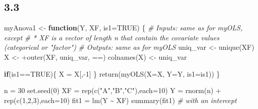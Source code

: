 \documentclass[
  11pt,
]{article}
\newenvironment{Shaded}{\begin{snugshade}}{\end{snugshade}}
\newcommand{\AttributeTok}[1]{\textcolor[rgb]{0.77,0.63,0.00}{#1}}
\newcommand{\CommentTok}[1]{\textcolor[rgb]{0.56,0.35,0.01}{\textit{#1}}}
\newcommand{\ConstantTok}[1]{\textcolor[rgb]{0.00,0.00,0.00}{#1}}
\newcommand{\ControlFlowTok}[1]{\textcolor[rgb]{0.13,0.29,0.53}{\textbf{#1}}}
\newcommand{\DecValTok}[1]{\textcolor[rgb]{0.00,0.00,0.81}{#1}}
\newcommand{\FunctionTok}[1]{\textcolor[rgb]{0.00,0.00,0.00}{#1}}
\newcommand{\NormalTok}[1]{#1}
\newcommand{\OtherTok}[1]{\textcolor[rgb]{0.56,0.35,0.01}{#1}}
\newcommand{\SpecialCharTok}[1]{\textcolor[rgb]{0.00,0.00,0.00}{#1}}
\newcommand{\StringTok}[1]{\textcolor[rgb]{0.31,0.60,0.02}{#1}}
\begin{document}
\hypertarget{section-2}{%
\subsection{3.3}\label{section-2}}

\begin{Shaded}
\begin{Highlighting}[]
\NormalTok{myAnova1 }\OtherTok{\textless{}{-}} \ControlFlowTok{function}\NormalTok{(Y, XF, }\AttributeTok{is1=}\ConstantTok{TRUE}\NormalTok{) \{}
\CommentTok{\# Inputs: same as for myOLS, except}
\CommentTok{\# * XF is a vector of length n that contain the covariate values (categorical or "factor")}
\CommentTok{\# Outputs: same as for myOLS}
\NormalTok{  uniq\_var }\OtherTok{\textless{}{-}} \FunctionTok{unique}\NormalTok{(XF)}
\NormalTok{  X }\OtherTok{\textless{}{-}} \SpecialCharTok{+}\FunctionTok{outer}\NormalTok{(XF, uniq\_var, }\StringTok{\textasciigrave{}}\AttributeTok{==}\StringTok{\textasciigrave{}}\NormalTok{)}
  \FunctionTok{colnames}\NormalTok{(X) }\OtherTok{\textless{}{-}}\NormalTok{ uniq\_var}
  
  \ControlFlowTok{if}\NormalTok{(is1}\SpecialCharTok{==}\ConstantTok{TRUE}\NormalTok{)\{}
\NormalTok{    X }\OtherTok{=}\NormalTok{ X[,}\SpecialCharTok{{-}}\DecValTok{1}\NormalTok{]}
\NormalTok{  \}}
  \FunctionTok{return}\NormalTok{(}\FunctionTok{myOLS}\NormalTok{(}\AttributeTok{X=}\NormalTok{X, }\AttributeTok{Y=}\NormalTok{Y, }\AttributeTok{is1=}\NormalTok{is1))}
\NormalTok{\}}
\end{Highlighting}
\end{Shaded}

\begin{Shaded}
\begin{Highlighting}[]
\NormalTok{n }\OtherTok{=} \DecValTok{30}
\FunctionTok{set.seed}\NormalTok{(}\DecValTok{0}\NormalTok{)}
\NormalTok{XF }\OtherTok{=} \FunctionTok{rep}\NormalTok{(}\FunctionTok{c}\NormalTok{(}\StringTok{"A"}\NormalTok{,}\StringTok{"B"}\NormalTok{,}\StringTok{"C"}\NormalTok{),}\AttributeTok{each=}\DecValTok{10}\NormalTok{)}
\NormalTok{Y }\OtherTok{=} \FunctionTok{rnorm}\NormalTok{(n) }\SpecialCharTok{+} \FunctionTok{rep}\NormalTok{(}\FunctionTok{c}\NormalTok{(}\DecValTok{1}\NormalTok{,}\DecValTok{2}\NormalTok{,}\DecValTok{3}\NormalTok{),}\AttributeTok{each=}\DecValTok{10}\NormalTok{)}
\NormalTok{fit1 }\OtherTok{=} \FunctionTok{lm}\NormalTok{(Y }\SpecialCharTok{\textasciitilde{}}\NormalTok{ XF)}
\FunctionTok{summary}\NormalTok{(fit1) }\CommentTok{\# with an intercept}
\end{Highlighting}
\end{Shaded}
\end{document}
